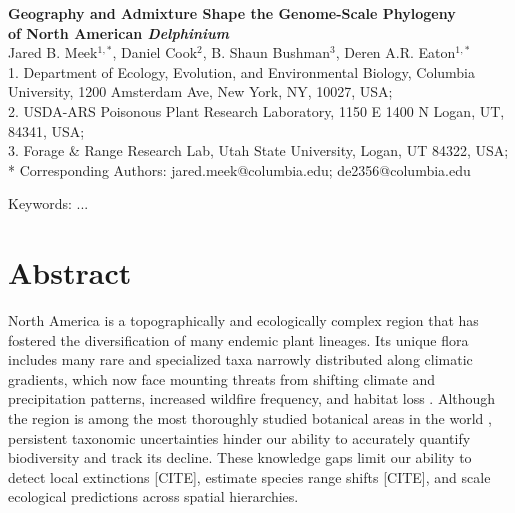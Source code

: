 \documentclass[11pt]{article}
\begin{document}
\begin{center}
	{\bf \Large
	Geography and Admixture Shape the Genome-Scale Phylogeny \\[0.2cm]
	of North American \emph{Delphinium}
	}\\[0.5cm]

Jared B. Meek$^{1,*}$, Daniel Cook$^2$, B. Shaun Bushman$^3$, Deren A.R. Eaton$^{1,*}$\\[0.5cm]

1. Department of Ecology, Evolution, and Environmental Biology, Columbia University, 1200 Amsterdam Ave, New York, NY, 10027, USA;\\
2. USDA-ARS Poisonous Plant Research Laboratory, 1150 E 1400 N Logan, UT, 84341, USA;\\ 3. Forage \& Range Research Lab, Utah State University, Logan, UT 84322, USA;\\ 
* Corresponding Authors: jared.meek@columbia.edu; de2356@columbia.edu

\end{center}

Keywords: ...

\RaggedRight

\section*{Abstract}
North America is a topographically and ecologically complex region that has fostered the 
diversification of many endemic plant lineages. Its unique flora includes many rare and
specialized taxa narrowly distributed along climatic gradients, which now face mounting
threats from shifting climate and precipitation patterns, increased wildfire frequency, and habitat loss
\citep{kannenberg_rapid_2021,overpeck_climate_2020}.
% 
Although the region is among the most thoroughly studied botanical areas in the world
\citep{hickman1993jepson}, persistent taxonomic uncertainties hinder our ability to
accurately quantify biodiversity and track its decline. 
These knowledge gaps limit our ability to detect local extinctions [CITE], 
estimate species range shifts [CITE], and scale ecological predictions across spatial hierarchies. 
\end{document}
